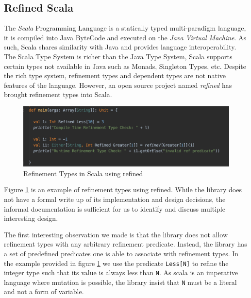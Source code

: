 \documentclass[a4paper,12pt]{report}
\begin{document}
\subsection{Refined Scala}
The \textit{Scala} \cite{scala} Programming Language is a statically 
typed multi-paradigm language, it is compiled into Java ByteCode and 
executed on the \textit{Java Virtual Machine}. 
As such, Scala shares similarity with Java and provides language 
interoperability. The Scala Type System is richer than the Java Type System, 
Scala supports certain types not available in Java such as Monads, 
Singleton Types, etc. Despite the rich type system, refinement types and dependent 
types are not native features of the language. However, an open source project 
named \textit{refined} \cite{refinedScala} has brought refinement types into Scala. 

\begin{figure}[H]
  \begin{center}
    \includegraphics[scale=0.7]{assets/refined_scala.PNG}
  \end{center}
  \caption{Refinement Types in Scala using refined}
  \label{code:refined-scala}
\end{figure}

Figure \ref{code:refined-scala} is an example of refinement types using  
refined. While the library does not have a formal write up of its 
implementation and design decisions, the informal documentation is sufficient 
for us to identify and discuss multiple interesting design. 

\par
The first interesting observation we made is that the library does not allow 
refinement types with any arbitrary refinement predicate. Instead,  
the library has a set of predefined predicates one is able to associate 
with refinement types. In the example provided in figure \ref{code:refined-scala} 
we use the predicate \verb|Less[N]| to refine the integer type such that its value 
is always less than \verb|N|. As scala is an imperative language where mutation 
is possible, the library insist that \verb|N| must be a 
literal and not a form of variable.
\end{document}
